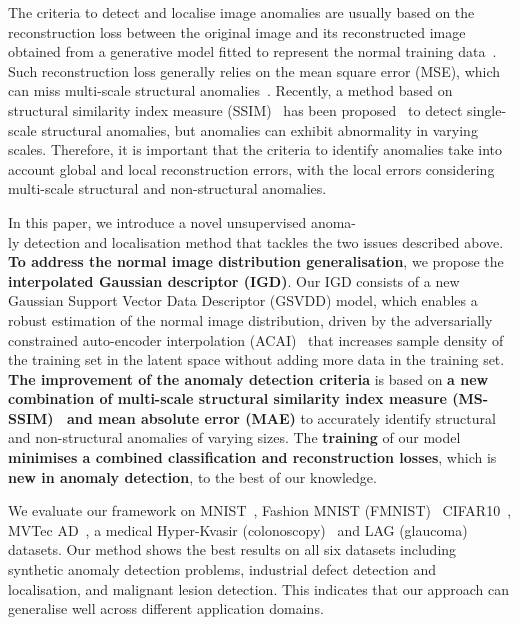 \documentclass[final]{cvpr}
\begin{document}
The criteria to detect and localise image anomalies are usually based on the reconstruction loss between the original image and its reconstructed image obtained from a generative model fitted to represent the normal training data~\cite{liu2018future,ren2015unsupervised,xu2015learning,ionescu2019object,gong2019memorizing,nguyen2019anomaly,sabokrou2017deep,sabokrou2018adversarially,morais2019learning}.
Such reconstruction loss generally relies on the mean square error (MSE), which can miss multi-scale structural anomalies~\cite{pangguansong2020,SSIM}.
Recently, a method based on structural similarity index measure (SSIM)~\cite{SSIM} has been proposed~\cite{ae-ssim} to detect single-scale structural anomalies, but
anomalies can exhibit abnormality in varying scales.
Therefore, it is important that the criteria to identify anomalies take into account global and local reconstruction errors, with the local errors considering
multi-scale structural and non-structural anomalies.

In this paper, we introduce a novel unsupervised anoma-\\ly detection and localisation method that tackles the two issues described above.
\textbf{To address the normal image distribution generalisation}, we propose the \textbf{interpolated Gaussian descriptor (IGD)}. Our IGD consists of a new Gaussian Support Vector Data  Descriptor (GSVDD) model, which enables a robust estimation of the normal image distribution, driven by the adversarially constrained auto-encoder interpolation (ACAI)~\cite{berthelot2018understanding} that increases sample density of the training set in the latent space without adding more data in the training set.
\textbf{The improvement of the anomaly detection criteria} is
based on \textbf{a new combination of multi-scale structural similarity index measure (MS-SSIM)~\cite{SSIM,MS-SSIM,zhao2016loss}
and mean absolute error (MAE)} to accurately identify structural and non-structural anomalies of varying sizes. 
The \textbf{training} of our model \textbf{minimises a combined classification and reconstruction losses}, which is \textbf{new in anomaly detection}, to the best of our knowledge.
 
We evaluate our framework on MNIST~\cite{lecun2010mnist}, Fashion MNIST (FMNIST)~\cite{fmnist} CIFAR10~\cite{krizhevsky2014cifar}, MVTec AD~\cite{mvtecad}, a medical Hyper-Kvasir (colonoscopy)~\cite{borgli2020hyperkvasir} and LAG (glaucoma)~\cite{li2019attention} datasets. Our method shows the best results on all six datasets including synthetic anomaly detection problems, industrial defect detection and localisation, and malignant lesion detection.  This indicates that our approach can generalise well across different application domains. 
\end{document}
